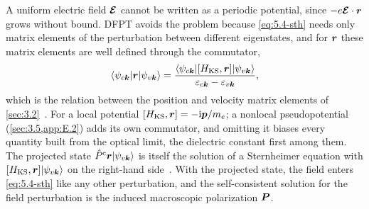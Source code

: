 A uniform electric field $\bm{\mathcal{E}}$ cannot be written as a periodic potential, since $-e\bm{\mathcal{E}}\cdot\bm{r}$ grows without bound. DFPT avoids the problem because \cref{eq:5.4-sth} needs only matrix elements of the perturbation between different eigenstates, and for $\bm{r}$ these matrix elements are well defined through the commutator,
\begin{equation}
  \langle\psi_{c\bm{k}}|\bm{r}|\psi_{v\bm{k}}\rangle = \frac{\langle\psi_{c\bm{k}}|[H_{\mathrm{KS}},\bm{r}]|\psi_{v\bm{k}}\rangle}{\varepsilon_{c\bm{k}} - \varepsilon_{v\bm{k}}} ,
  \label{eq:E.4-rcomm}
\end{equation}
which is the relation between the position and velocity matrix elements of \cref{sec:3.2}~\cite[Eq.~(37)]{baroni2001phonons}. For a local potential $[H_{\mathrm{KS}},\bm{r}] = -\mathrm{i}\bm{p}/m_e$; a nonlocal pseudopotential (\cref{sec:3.5,app:E.2}) adds its own commutator, and omitting it biases every quantity built from the optical limit, the dielectric constant first among them. The projected state $\hat{P}^{\mathrm{c}}\bm{r}|\psi_{v\bm{k}}\rangle$ is itself the solution of a Sternheimer equation with $[H_{\mathrm{KS}},\bm{r}]|\psi_{v\bm{k}}\rangle$ on the right-hand side~\cite[Eq.~(44)]{baroni2001phonons}. With the projected state, the field enters \cref{eq:5.4-sth} like any other perturbation, and the self-consistent solution for the field perturbation is the induced macroscopic polarization $\bm{P}$.

